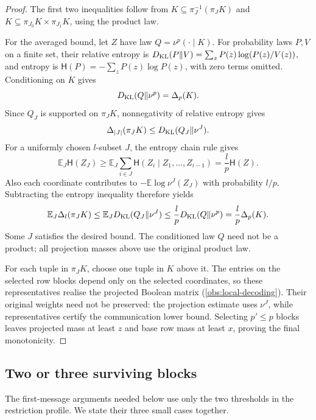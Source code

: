 \documentclass[11pt]{article} \usepackage[utf8]{inputenc}
\theoremstyle{plain} \newtheorem{theorem}{Theorem}[section]
\theoremstyle{definition} \newaliascnt{definition}{theorem}
\begin{document}
\begin{proof}
The first two inequalities follow from
$K\subseteq\pi_J^{-1}(\pi_JK)$ and
$K\subseteq\pi_{J_0}K\times\pi_{J_1}K$, using the product law.

For the averaged bound, let $Z$ have law $Q=\nu^p(\cdot\mid K)$.
For probability laws $P,V$ on a finite set, their relative entropy is
$D_{\rm KL}(P\|V)=\sum_zP(z)\log(P(z)/V(z))$, and entropy is
$\mathsf H(P)=-\sum_zP(z)\log P(z)$, with zero terms omitted.
Conditioning on $K$ gives
\[
D_{\rm KL}(Q\|\nu^p)=\Delta_p(K).
\]
Since $Q_J$ is supported on $\pi_JK$, nonnegativity of relative entropy gives
\[
\Delta_{|J|}(\pi_JK)\le D_{\rm KL}(Q_J\|\nu^J).
\]
For a uniformly chosen $l$-subset $J$, the entropy chain rule gives
\[
\mathbb E_J\mathsf H(Z_J)
\ge\mathbb E_J\sum_{i\in J}\mathsf H(Z_i\mid Z_1,\ldots,Z_{i-1})
=\frac lp\mathsf H(Z).
\]
Also each coordinate contributes to
$-\mathbb E\log\nu^J(Z_J)$ with probability $l/p$. Subtracting the entropy
inequality therefore yields
\[
\mathbb E_J\Delta_l(\pi_JK)
\le\mathbb E_JD_{\rm KL}(Q_J\|\nu^J)
\le\frac lpD_{\rm KL}(Q\|\nu^p)=\frac lp\Delta_p(K).
\]
Some $J$ satisfies the desired bound. The conditioned law $Q$ need not be a
product; all projection masses above use the original product law.

For each tuple in $\pi_JK$, choose one tuple in $K$ above it. The entries on the
selected row blocks depend only on the selected coordinates, so these
representatives realise the projected Boolean matrix
(\cref{obs:local-decoding}). Their original weights need not be preserved:
the projection estimate uses $\nu^J$, while representatives certify the
communication lower bound. Selecting $p'\le p$ blocks leaves projected mass
at least $z$ and base row mass at least $x$, proving the final monotonicity.
\end{proof}

\subsection{Two or three surviving blocks}

The first-message arguments needed below use only the two thresholds in the
restriction profile. We state their three small cases together.
\end{document}
